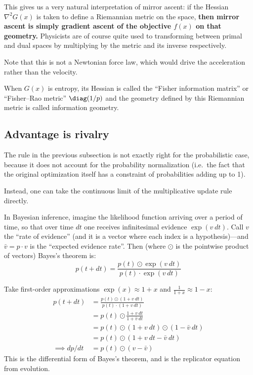 This gives us a very natural interpretation of mirror ascent: if the Hessian
$\nabla^2 G(x)$ is taken to define a Riemannian metric on the space, \textbf{then mirror ascent is
simply gradient ascent of the objective $f(x)$ on that geometry.} Physicists are of course
quite used to transforming between primal and dual spaces by multiplying by the metric and
its inverse respectively.

Note that this is not a Newtonian force law, which would drive the acceleration rather than
the velocity.

When $G(x)$ is entropy, its Hessian is called the ``Fisher information matrix'' or
``Fisher--Rao metric'' $\diag(1/p)$ and the geometry defined by this Riemannian metric is
called information geometry.

\subsection{Advantage is rivalry}\label{agency:sec:advantage-rivalry}

The rule in the previous subsection is not exactly right for the probabilistic case,
because it does not account for the probability normalization (i.e.\ the fact that the
original optimization itself has a constraint of probabilities adding up to 1).

Instead, one can take the continuous limit of the multiplicative update rule directly.

In Bayesian inference, imagine the likelihood function arriving over a period of time, so
that over time $dt$ one receives infinitesimal evidence $\exp(v\ dt)$. Call $v$ the ``rate of
evidence'' (and it is a vector where each index is a hypothesis)---and $\bar{v}=p\cdot v$ is
the ``expected evidence rate''. Then (where $\odot$ is the pointwise product of vectors)
Bayes's theorem is:
\[p(t+dt)=\frac{p(t)\odot\exp(v\ dt)}{p(t)\cdot \exp(v\ dt)}\]

Take first-order approximations $\exp(x)\approx 1 + x$ and $\frac1{1+x}\approx 1-x$:
\begin{align*}
p(t+dt)&=\frac{p(t)\odot (1+ v\ dt)}{p(t)\cdot (1+ v\ dt)}\\
&=p(t)\odot \frac{1+ v\ dt}{1 + \bar{v}\ dt}\\
&= p(t)\odot (1+v\ dt) \odot (1-\bar{v}\ dt)\\
&= p(t)\odot (1+v\ dt-\bar{v}\ dt)\\
\implies dp/dt&= p(t)\odot(v-\bar{v})
\end{align*}
This is the differential form of Bayes's theorem, and is the replicator equation from
evolution.

